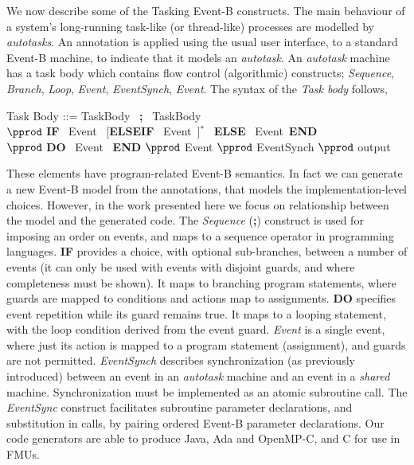 \documentclass{llncs}%
\begin{document}
We now describe some of the Tasking Event-B constructs. The main behaviour of a system's  long-running task-like (or thread-like) processes are modelled by \emph{autotasks}. An annotation is applied using the usual user interface, to a standard Event-B machine, to indicate that it models an \emph{autotask}. An \emph{autotask} machine has a task body which contains flow control (algorithmic) constructs; \emph{Sequence}, \emph{Branch}, \emph{Loop}, \emph{Event}, \emph{EventSynch}, \emph{Event}. The syntax of the \emph{Task body} follows,
%
%
\begin{center}
\begin{minipage}{0.7\textwidth}
Task Body ::= TaskBody~ \textbf{;}~ TaskBody\\
\hspace*{1cm}$\pprod$ \textbf{IF}~ Event~ [\textbf{ELSEIF}~ Event~]$^*$~ \textbf{ELSE}~ Event~\textbf{END} \\
\hspace*{1cm}$\pprod$ \textbf{DO}~ Event~ \textbf{END} $\pprod$ Event $\pprod$ EventSynch $\pprod$ output 
\end{minipage}
\end{center}
%
\noindent These elements have program-related Event-B semantics. In fact we can generate a new Event-B model from the annotations, that models the implementation-level choices. However, in the work presented here we focus on relationship between the model and the generated code. The \emph{Sequence} (\textbf{;}) construct is used for imposing an order on events, and maps to a sequence operator in programming languages. \textbf{IF} provides a choice, with optional sub-branches, between a number of events (it can only be used with events with disjoint guards, and where completeness must be shown). It maps to branching program statements, where guards are mapped to conditions and actions map to assignments. \textbf{DO} specifies event repetition while its guard remains true. It maps to a looping statement, with the loop condition derived from the event guard. \emph{Event} is a single event, where just its action is mapped to a program statement (assignment), and guards are not permitted. \emph{EventSynch} describes synchronization (as previously introduced) between an event in an \emph{autotask} machine and an event in a \emph{shared} machine. Synchronization must be implemented as an atomic subroutine call. The \emph{EventSync} construct facilitates subroutine parameter declarations, and substitution in calls, by pairing ordered Event-B parameter declarations. Our code generators are able to produce Java, Ada and OpenMP-C, and C for use in FMUs.
\end{document}
